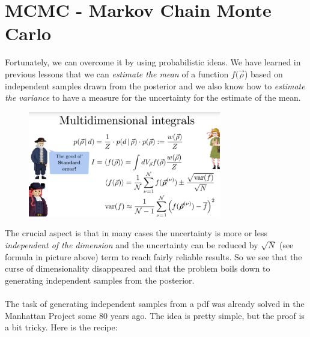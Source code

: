 \documentclass[12pt, a4paper]{scrartcl}
\begin{document}
\section*{MCMC - Markov Chain Monte Carlo}
Fortunately, we can overcome it by using probabilistic ideas. We have learned
in previous lessons that we can \textit{estimate the mean} of a function $f(\vec{\rho}$) based on independent samples drawn from the posterior
and we also know how to \textit{estimate the variance}
to have a measure for the uncertainty for the estimate of the mean.\\%
 \begin{figure}[H]
	\centering
	\includegraphics[width=0.75\textwidth]{9_5.png}
\end{figure}

The crucial aspect is that in many cases the uncertainty is more or less
\textit{independent of the dimension} and the uncertainty can be reduced by $\sqrt{N}$ (see formula in picture above) term to reach fairly reliable results. 
So we see that
the curse of dimensionality disappeared and that the problem boils down to
generating independent samples from the posterior.\\

\\

The task of generating independent samples from a pdf was already
solved in the Manhattan Project some 80 years ago. The idea is pretty
simple, but the proof is a bit tricky. Here is the recipe:\\
\end{document}
